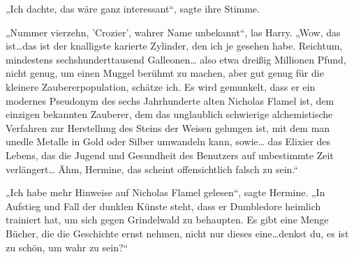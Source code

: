 „Ich dachte, das wäre ganz interessant“, sagte ihre Stimme.

„Nummer vierzehn, 'Crozier', wahrer Name unbekannt“, las Harry. „Wow, das ist…das ist der knalligste karierte Zylinder, den ich je gesehen habe. Reichtum, mindestens sechshunderttausend Galleonen… also etwa dreißig Millionen Pfund, nicht genug, um einen Muggel berühmt zu machen, aber gut genug für die kleinere Zaubererpopulation, schätze ich. Es wird gemunkelt, dass er ein modernes Pseudonym des sechs Jahrhunderte alten Nicholas Flamel ist, dem einzigen bekannten Zauberer, dem das unglaublich schwierige alchemistische Verfahren zur Herstellung des Steins der Weisen gelungen ist, mit dem man unedle Metalle in Gold oder Silber umwandeln kann, sowie… das Elixier des Lebens, das die Jugend und Gesundheit des Benutzers auf unbestimmte Zeit verlängert… Ähm, Hermine, das scheint offensichtlich falsch zu sein.“

„Ich habe mehr Hinweise auf Nicholas Flamel gelesen“, sagte Hermine. „In Aufstieg und Fall der dunklen Künste steht, dass er Dumbledore heimlich trainiert hat, um sich gegen Grindelwald zu behaupten. Es gibt eine Menge Bücher, die die Geschichte ernst nehmen, nicht nur dieses eine…denkst du, es ist zu schön, um wahr zu sein?“

